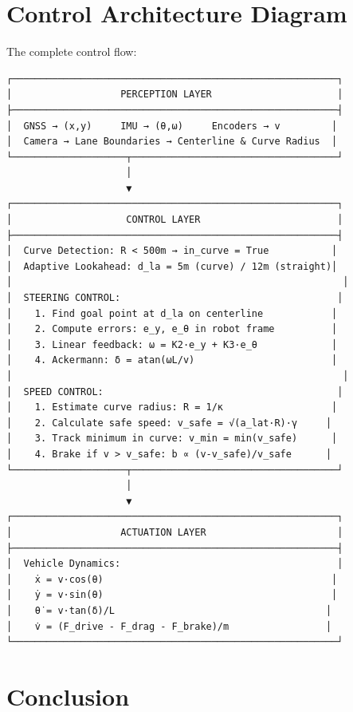 \documentclass[11pt,a4paper]{article}
\begin{document}
\section{Control Architecture Diagram}

The complete control flow:

\begin{verbatim}
┌─────────────────────────────────────────────────────────┐
│                   PERCEPTION LAYER                      │
├─────────────────────────────────────────────────────────┤
│  GNSS → (x,y)     IMU → (θ,ω)     Encoders → v         │
│  Camera → Lane Boundaries → Centerline & Curve Radius  │
└────────────────────┬────────────────────────────────────┘
                     │
                     ▼
┌─────────────────────────────────────────────────────────┐
│                    CONTROL LAYER                        │
├─────────────────────────────────────────────────────────┤
│  Curve Detection: R < 500m → in_curve = True           │
│  Adaptive Lookahead: d_la = 5m (curve) / 12m (straight)│
│                                                          │
│  STEERING CONTROL:                                      │
│    1. Find goal point at d_la on centerline            │
│    2. Compute errors: e_y, e_θ in robot frame          │
│    3. Linear feedback: ω = K2·e_y + K3·e_θ             │
│    4. Ackermann: δ = atan(ωL/v)                        │
│                                                          │
│  SPEED CONTROL:                                         │
│    1. Estimate curve radius: R = 1/κ                   │
│    2. Calculate safe speed: v_safe = √(a_lat·R)·γ     │
│    3. Track minimum in curve: v_min = min(v_safe)      │
│    4. Brake if v > v_safe: b ∝ (v-v_safe)/v_safe      │
└────────────────────┬────────────────────────────────────┘
                     │
                     ▼
┌─────────────────────────────────────────────────────────┐
│                   ACTUATION LAYER                       │
├─────────────────────────────────────────────────────────┤
│  Vehicle Dynamics:                                      │
│    ẋ = v·cos(θ)                                        │
│    ẏ = v·sin(θ)                                        │
│    θ̇ = v·tan(δ)/L                                     │
│    v̇ = (F_drive - F_drag - F_brake)/m                 │
└─────────────────────────────────────────────────────────┘
\end{verbatim}

\section{Conclusion}
\end{document}
